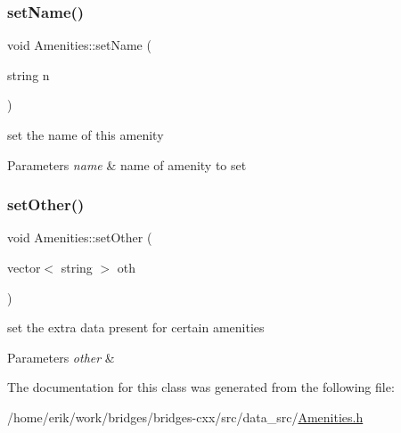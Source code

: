\subsubsection{\texorpdfstring{set\+Name()}{setName()}}
{\footnotesize\ttfamily void Amenities\+::set\+Name (\begin{DoxyParamCaption}\item[{string}]{n }\end{DoxyParamCaption})\hspace{0.3cm}{\ttfamily [inline]}}

set the name of this amenity 
\begin{DoxyParams}{Parameters}
{\em name} & name of amenity to set \\
\hline
\end{DoxyParams}
\mbox{\label{class_amenities_a97c54a9e60bc8016055963f0ce1a08f0}} 
\subsubsection{\texorpdfstring{set\+Other()}{setOther()}}
{\footnotesize\ttfamily void Amenities\+::set\+Other (\begin{DoxyParamCaption}\item[{vector$<$ string $>$}]{oth }\end{DoxyParamCaption})\hspace{0.3cm}{\ttfamily [inline]}}

set the extra data present for certain amenities 
\begin{DoxyParams}{Parameters}
{\em other} & \\
\hline
\end{DoxyParams}


The documentation for this class was generated from the following file\+:\begin{DoxyCompactItemize}
\item 
/home/erik/work/bridges/bridges-\/cxx/src/data\+\_\+src/\hyperlink{_amenities_8h}{Amenities.\+h}\end{DoxyCompactItemize}
